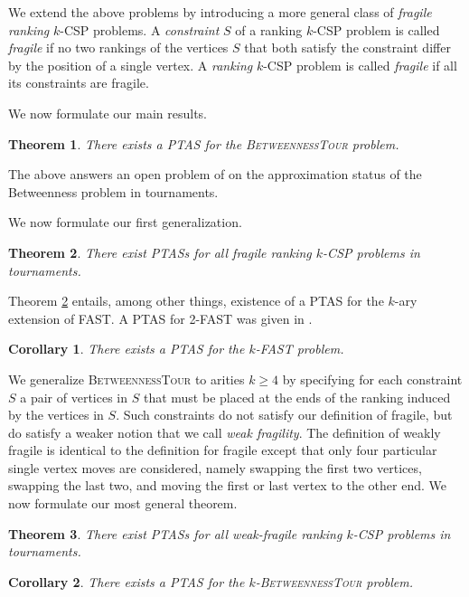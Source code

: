 \documentclass[dvips,11pt,letter]{article}
\newtheorem{theorem}{Theorem} \newtheorem{conjecture}[theorem]{Conjecture}
\newtheorem{anonCorollary}{Corollary}
\newcommand{\betTour}{\textsc{BetweennessTour}}
\newcommand{\fast}{\textsc{FAST}}
\begin{document}
We extend the above problems by introducing a more general class of \emph{fragile ranking} $k$-CSP problems.
A \emph{constraint} $S$ of a ranking $k$-CSP problem is called \emph{fragile} if no two rankings of the vertices $S$ that both satisfy the constraint differ by the position of a single vertex.
A \emph{ranking} $k$-CSP problem is called \emph{fragile} if all its
constraints are fragile.

We now formulate  our main results.
\begin{theorem} \label{thm:main}
There exists a PTAS for the \betTour{} problem.
\end{theorem}
The above answers an open problem of \cite{AA07} on the approximation status of the Betweenness problem in tournaments.

We now formulate our first generalization.
\begin{theorem} \label{thm:strongFragile}
There exist PTASs for all \emph{fragile ranking} $k$-CSP problems in tournaments.
\end{theorem}

Theorem \ref{thm:strongFragile} entails, among other things, existence of a PTAS for the $k$-ary
extension of \fast{}. A PTAS for 2-\fast{} was given in \cite{mathieu09fast}.

\begin{anonCorollary}
There exists a PTAS for the $k$-\fast{} problem.
\end{anonCorollary}

We  generalize \betTour{} to arities $k \ge 4$ by specifying for each constraint $S$ a pair of vertices in $S$ that must be placed at the ends of the ranking induced by the vertices in $S$. Such constraints do not satisfy our definition of fragile, but do satisfy a weaker notion that we call \emph{weak fragility}. The definition of weakly fragile is identical to the definition for fragile except that only four particular single vertex moves are considered, namely swapping the first two vertices, swapping the last two, and moving the first or last vertex to the other end.
We now formulate our most general theorem.
\begin{theorem} \label{thm:weakFragile}
There exist PTASs for all \emph{weak-fragile ranking} $k$-CSP problems in tournaments.
\end{theorem}

\begin{anonCorollary}
There exists a PTAS for the $k$-\betTour{} problem.
\end{anonCorollary}
\end{document}
